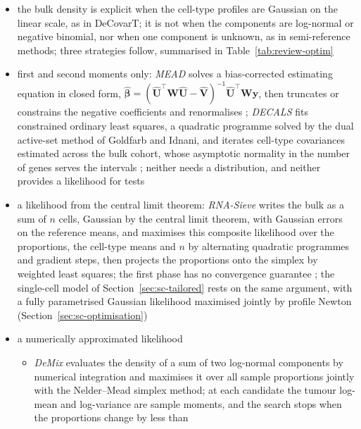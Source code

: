 \begin{itemize}
  \item the bulk density is explicit when the cell-type profiles are Gaussian on the linear scale, as in DeCovarT; it is not
        when the components are log-normal or negative binomial, nor when one component is unknown, as in semi-reference
        methods; three strategies follow, summarised in Table~\ref{tab:review-optim}
  \item first and second moments only: \emph{MEAD} solves a bias-corrected estimating equation in closed form,
        \(\hat{\boldsymbol{\beta}}=(\hat{\boldsymbol{U}}^{\top}\boldsymbol{W}\hat{\boldsymbol{U}}-\hat{\boldsymbol{V}})^{-1}\hat{\boldsymbol{U}}^{\top}\boldsymbol{W}\boldsymbol{y}\), then truncates or constrains the
        negative coefficients and renormalises \cite[pp.~8--10]{xieStatisticalInferenceCell2026}; \emph{DECALS} fits
        constrained ordinary least squares, a quadratic programme solved by the dual active-set method of Goldfarb and
        Idnani, and iterates cell-type covariances estimated across the bulk cohort, whose asymptotic normality in the
        number of genes serves the intervals \cite[pp.~6--9]{caiStatisticalInferenceCelltype2024}; neither needs a
        distribution, and neither provides a likelihood for tests
  \item a likelihood from the central limit theorem: \emph{RNA-Sieve} writes the bulk as a sum of \(n\) cells, Gaussian by the
        central limit theorem, with Gaussian errors on the reference means, and maximises this composite likelihood over the
        proportions, the cell-type means and \(n\) by alternating quadratic programmes and gradient steps, then projects the
        proportions onto the simplex by weighted least squares; the first phase has no convergence guarantee
        \cite[p.~1804 and Supplemental Sect.~S1.6]{erdmann-phamLikelihoodbasedDeconvolutionBulk2021}; the single-cell model
        of Section~\ref{sec:sc-tailored} rests on the same argument, with a fully parametrised Gaussian likelihood maximised
        jointly by profile Newton (Section~\ref{sec:sc-optimisation})
  \item a numerically approximated likelihood
  \begin{itemize}
    \item \emph{DeMix} evaluates the density of a sum of two log-normal components by numerical integration and maximises
          it over all sample proportions jointly with the Nelder--Mead simplex method; at each candidate the tumour
          log-mean and log-variance are sample moments, and the search stops when the proportions change by less than

\end{itemize}
\end{itemize}
